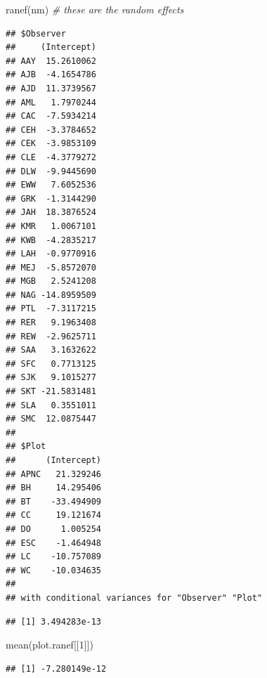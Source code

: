 \documentclass[
]{article}
\newenvironment{Shaded}{\begin{snugshade}}{\end{snugshade}}
\newcommand{\CommentTok}[1]{\textcolor[rgb]{0.56,0.35,0.01}{\textit{#1}}}
\newcommand{\DecValTok}[1]{\textcolor[rgb]{0.00,0.00,0.81}{#1}}
\newcommand{\DocumentationTok}[1]{\textcolor[rgb]{0.56,0.35,0.01}{\textbf{\textit{#1}}}}
\newcommand{\FunctionTok}[1]{\textcolor[rgb]{0.00,0.00,0.00}{#1}}
\newcommand{\NormalTok}[1]{#1}
\newcommand{\OtherTok}[1]{\textcolor[rgb]{0.56,0.35,0.01}{#1}}
\newcommand{\SpecialCharTok}[1]{\textcolor[rgb]{0.00,0.00,0.00}{#1}}
\begin{document}
\begin{Shaded}
\begin{Highlighting}[]
\FunctionTok{ranef}\NormalTok{(nm) }\CommentTok{\# these are the random effects}
\end{Highlighting}
\end{Shaded}

\begin{verbatim}
## $Observer
##     (Intercept)
## AAY  15.2610062
## AJB  -4.1654786
## AJD  11.3739567
## AML   1.7970244
## CAC  -7.5934214
## CEH  -3.3784652
## CEK  -3.9853109
## CLE  -4.3779272
## DLW  -9.9445690
## EWW   7.6052536
## GRK  -1.3144290
## JAH  18.3876524
## KMR   1.0067101
## KWB  -4.2835217
## LAH  -0.9770916
## MEJ  -5.8572070
## MGB   2.5241208
## NAG -14.8959509
## PTL  -7.3117215
## RER   9.1963408
## REW  -2.9625711
## SAA   3.1632622
## SFC   0.7713125
## SJK   9.1015277
## SKT -21.5831481
## SLA   0.3551011
## SMC  12.0875447
## 
## $Plot
##      (Intercept)
## APNC   21.329246
## BH     14.295406
## BT    -33.494909
## CC     19.121674
## DO      1.005254
## ESC    -1.464948
## LC    -10.757089
## WC    -10.034635
## 
## with conditional variances for "Observer" "Plot"
\end{verbatim}

\begin{Shaded}
\end{Shaded}

\begin{verbatim}
## [1] 3.494283e-13
\end{verbatim}

\begin{Shaded}
\begin{Highlighting}[]
\FunctionTok{mean}\NormalTok{(plot.ranef[[}\DecValTok{1}\NormalTok{]])}
\end{Highlighting}
\end{Shaded}

\begin{verbatim}
## [1] -7.280149e-12
\end{verbatim}
\end{document}
